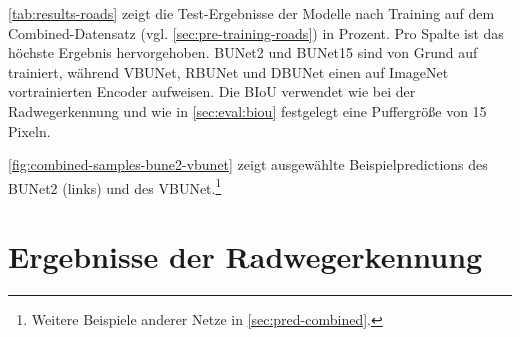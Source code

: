 \autoref{tab:results-roads} zeigt die Test-Ergebnisse der Modelle nach Training auf dem Combined-Datensatz 
(vgl. \autoref{sec:pre-training-roads}) in Prozent. Pro Spalte ist das höchste Ergebnis hervorgehoben. 
\ac{BUNet2} und \ac{BUNet15} sind von Grund auf trainiert, während \ac{VBUNet}, \ac{RBUNet} und \ac{DBUNet} einen auf 
ImageNet vortrainierten Encoder aufweisen. Die \ac{BIoU} verwendet wie bei der Radwegerkennung und wie in \autoref{sec:eval:biou} 
festgelegt eine Puffergröße von 15 Pixeln. 

\autoref{fig:combined-samples-bune2-vbunet} zeigt ausgewählte Beispielpredictions des \ac{BUNet2} (links) und 
des \ac{VBUNet}.\footnote{Weitere Beispiele anderer Netze in \autoref{sec:pred-combined}.}

\section{Ergebnisse der Radwegerkennung}

